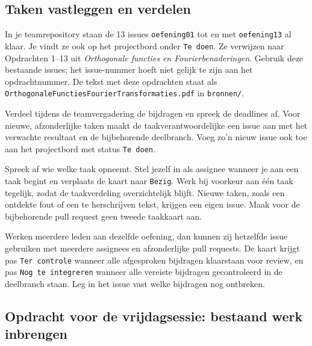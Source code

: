 \documentclass[kulak]{kulakarticle} %
\begin{document}
\subsection{Taken vastleggen en verdelen}

In je teamrepository staan de 13 issues \texttt{oefening01} tot en met
\texttt{oefening13} al klaar. Je vindt ze ook op het projectbord onder
\texttt{Te doen}. Ze verwijzen naar Opdrachten 1--13 uit
\emph{Orthogonale functies en Fourierbenaderingen}. Gebruik deze bestaande
issues; het issue-nummer hoeft niet gelijk te zijn aan het opdrachtnummer.
De tekst met deze opdrachten staat als
\texttt{OrthogonaleFunctiesFourierTransformaties.pdf} in \texttt{bronnen/}.

Verdeel tijdens de teamvergadering de bijdragen en spreek de deadlines af.
Voor nieuwe, afzonderlijke taken maakt de
taakverantwoordelijke een issue aan met het verwachte resultaat en de
bijbehorende deelbranch. Voeg zo'n nieuw issue ook toe aan het projectbord
met status \texttt{Te doen}.

Spreek af wie welke taak opneemt. Stel jezelf in als assignee wanneer je
aan een taak begint en verplaats de kaart naar \texttt{Bezig}.
Werk bij voorkeur aan één taak tegelijk, zodat de taakverdeling overzichtelijk
blijft. Nieuwe taken, zoals een ontdekte fout of een te herschrijven tekst,
krijgen een eigen issue. Maak voor de bijbehorende pull request geen tweede
taakkaart aan.

Werken meerdere leden aan dezelfde oefening, dan kunnen zij hetzelfde
issue gebruiken met meerdere assignees en afzonderlijke pull requests.
De kaart krijgt pas \texttt{Ter controle} wanneer alle afgesproken
bijdragen klaarstaan voor review, en pas \texttt{Nog te integreren} wanneer
alle vereiste bijdragen gecontroleerd in de deelbranch staan. Leg in het
issue vast welke bijdragen nog ontbreken.

\subsection{Opdracht voor de vrijdagsessie: bestaand werk inbrengen}
\label{ssec:vrijdagsessie}
\end{document}
